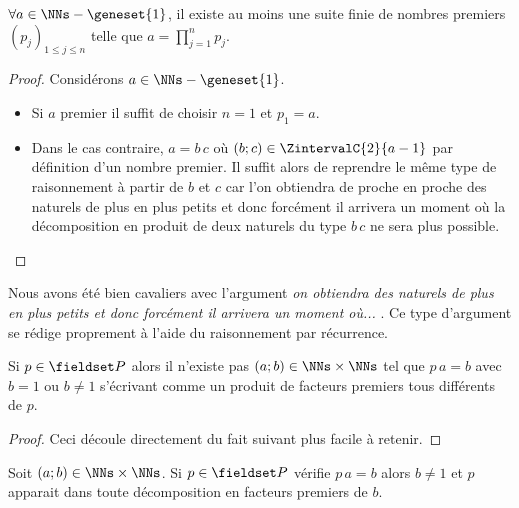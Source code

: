 \begin{fact} \label{exists-decompo}
	$\forall a \in \NNs - \geneset{1}$, il existe au moins une suite finie de nombres premiers $(p_j)_{1 \leq j \leq n}$
	telle que $\displaystyle a = \prod_{j=1}^{n} p_j$. 
\end{fact}

\begin{proof}
	Considérons $a \in \NNs - \geneset{1}$.
	
	\begin{itemize}[label=\small\textbullet]
		\item Si $a$ premier il suffit de choisir $n = 1$ et $p_1 = a$.
	
	
		\item Dans le cas contraire, $a = b \, c$ où $(b ; c) \in \ZintervalC{2}{a-1}$ par définition d'un nombre premier.
		Il suffit alors de reprendre le même type de raisonnement à partir de $b$ et $c$ car l'on obtiendra de proche en proche des naturels de plus en plus petits et donc forcément il arrivera un moment où la décomposition en produit de deux naturels du type $b \, c$ ne sera plus possible.
	\end{itemize}
\end{proof}


\begin{unproved}
	Nous avons été bien cavaliers avec l'argument \emph{\og on obtiendra des naturels de plus en plus petits et donc forcément il arrivera un moment où... \fg}. Ce type d'argument se rédige proprement à l'aide du raisonnement par récurrence.

\end{unproved}



\begin{fact} \label{pseudo-prime-divisor}
	Si $p \in \PP$ alors il n'existe pas $(a ; b) \in \NNs \times \NNs$ tel que
	$p \, a = b$ avec $b = 1$ ou $b \neq 1$ s'écrivant comme un produit de facteurs premiers tous différents de $p$.
\end{fact}
	

\begin{proof}
	Ceci découle directement du fait suivant plus facile à retenir.
\end{proof}



\begin{fact} \label{prime-divisor}
	Soit
	$(a ; b) \in \NNs \times \NNs$.
	Si $p \in \PP$ vérifie $p \, a = b$ alors $b \neq 1$ et $p$ apparait dans toute décomposition en facteurs premiers de $b$.
\end{fact}
	

